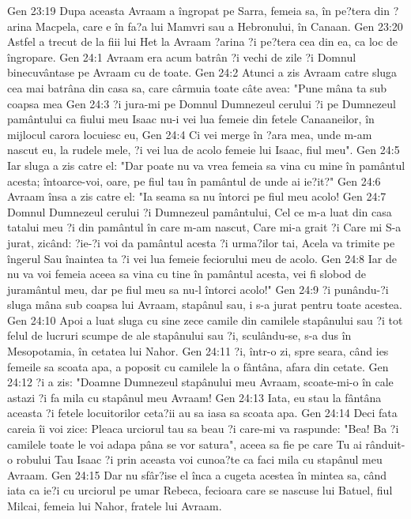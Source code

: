 Gen 23:19  Dupa aceasta Avraam a îngropat pe Sarra, femeia sa, în pe?tera din ?arina Macpela, care e în fa?a lui Mamvri sau a Hebronului, în Canaan.
Gen 23:20  Astfel a trecut de la fiii lui Het la Avraam ?arina ?i pe?tera cea din ea, ca loc de îngropare.
Gen 24:1  Avraam era acum batrân ?i vechi de zile ?i Domnul binecuvântase pe Avraam cu de toate.
Gen 24:2  Atunci a zis Avraam catre sluga cea mai batrâna din casa sa, care cârmuia toate câte avea: "Pune mâna ta sub coapsa mea
Gen 24:3  ?i jura-mi pe Domnul Dumnezeul cerului ?i pe Dumnezeul pamântului ca fiului meu Isaac nu-i vei lua femeie din fetele Canaaneilor, în mijlocul carora locuiesc eu,
Gen 24:4  Ci vei merge în ?ara mea, unde m-am nascut eu, la rudele mele, ?i vei lua de acolo femeie lui Isaac, fiul meu".
Gen 24:5  Iar sluga a zis catre el: "Dar poate nu va vrea femeia sa vina cu mine în pamântul acesta; întoarce-voi, oare, pe fiul tau în pamântul de unde ai ie?it?"
Gen 24:6  Avraam însa a zis catre el: "Ia seama sa nu întorci pe fiul meu acolo!
Gen 24:7  Domnul Dumnezeul cerului ?i Dumnezeul pamântului, Cel ce m-a luat din casa tatalui meu ?i din pamântul în care m-am nascut, Care mi-a grait ?i Care mi S-a jurat, zicând: ?ie-?i voi da pamântul acesta ?i urma?ilor tai, Acela va trimite pe îngerul Sau înaintea ta ?i vei lua femeie feciorului meu de acolo.
Gen 24:8  Iar de nu va voi femeia aceea sa vina cu tine în pamântul acesta, vei fi slobod de juramântul meu, dar pe fiul meu sa nu-l întorci acolo!"
Gen 24:9  ?i punându-?i sluga mâna sub coapsa lui Avraam, stapânul sau, i s-a jurat pentru toate acestea.
Gen 24:10  Apoi a luat sluga cu sine zece camile din camilele stapânului sau ?i tot felul de lucruri scumpe de ale stapânului sau ?i, sculându-se, s-a dus în Mesopotamia, în cetatea lui Nahor.
Gen 24:11  ?i, într-o zi, spre seara, când ies femeile sa scoata apa, a poposit cu camilele la o fântâna, afara din cetate.
Gen 24:12  ?i a zis: "Doamne Dumnezeul stapânului meu Avraam, scoate-mi-o în cale astazi ?i fa mila cu stapânul meu Avraam!
Gen 24:13  Iata, eu stau la fântâna aceasta ?i fetele locuitorilor ceta?ii au sa iasa sa scoata apa.
Gen 24:14  Deci fata careia îi voi zice: Pleaca urciorul tau sa beau ?i care-mi va raspunde: "Bea! Ba ?i  camilele toate le voi adapa pâna se vor satura", aceea sa fie pe care Tu ai rânduit-o robului Tau Isaac ?i prin aceasta voi cunoa?te ca faci mila cu stapânul meu Avraam.
Gen 24:15  Dar nu sfâr?ise el înca a cugeta acestea în mintea sa, când iata ca ie?i cu urciorul pe umar Rebeca, fecioara care se nascuse lui Batuel, fiul Milcai, femeia lui Nahor, fratele lui Avraam.

